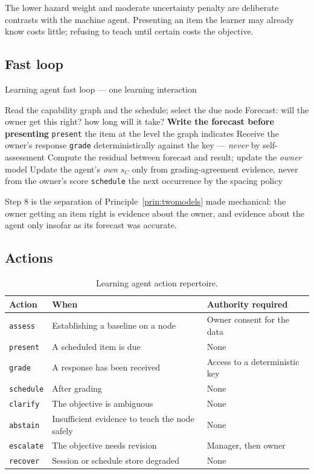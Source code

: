 \documentclass[11pt]{article}
\newcommand{\code}[1]{\texttt{\small #1}}
\begin{document}
The lower hazard weight and moderate uncertainty penalty are deliberate contrasts with the machine agent. Presenting an item the learner may already know costs little; refusing to teach until certain costs the objective.

\subsection{Fast loop}

\begin{algorithm}[H]
\caption{Learning agent fast loop --- one learning interaction}
\label{alg:lrn}
\SetAlgoLined
Read the capability graph and the schedule; select the due node\;
Forecast: will the owner get this right? how long will it take?\;
\textbf{Write the forecast before presenting}\;
\code{present} the item at the level the graph indicates\;
Receive the owner's response\;
\code{grade} deterministically against the key --- \emph{never} by self-assessment\;
Compute the residual between forecast and result; update the \emph{owner} model\;
Update the agent's \emph{own} $s_C$ only from grading-agreement evidence, never from the owner's score\;
\code{schedule} the next occurrence by the spacing policy\;
\end{algorithm}

Step 8 is the separation of Principle~\ref{prin:twomodels} made mechanical: the owner getting an item right is evidence about the owner, and evidence about the agent only insofar as its forecast was accurate.

\subsection{Actions}

\begin{table}[h]
\centering\small
\caption{Learning agent action repertoire.}
\label{tab:lrn-actions}
\begin{tabular}{@{}L{2.1cm}L{5.7cm}L{5.4cm}@{}}
\toprule
\textbf{Action} & \textbf{When} & \textbf{Authority required} \\
\midrule
\code{assess} & Establishing a baseline on a node & Owner consent for the data \\
\code{present} & A scheduled item is due & None \\
\code{grade} & A response has been received & Access to a deterministic key \\
\code{schedule} & After grading & None \\
\code{clarify} & The objective is ambiguous & None \\
\code{abstain} & Insufficient evidence to teach the node safely & None \\
\code{escalate} & The objective needs revision & Manager, then owner \\
\code{recover} & Session or schedule store degraded & None \\
\bottomrule
\end{tabular}
\end{table}
\end{document}
